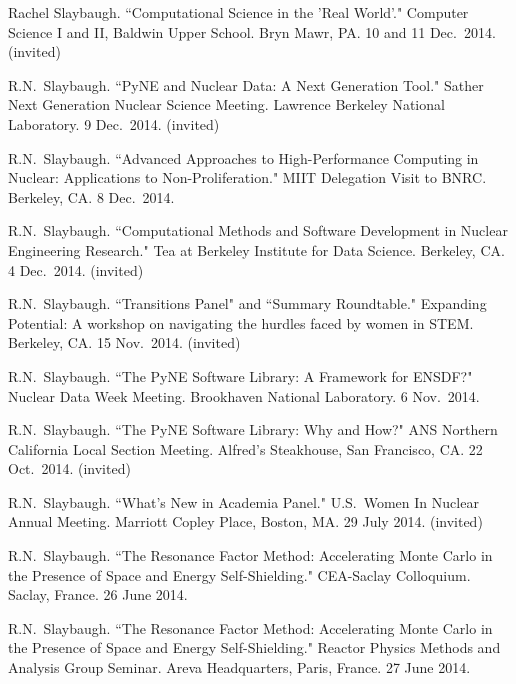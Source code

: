 \begin{bibsection}
\item Rachel Slaybaugh. ``Computational Science in the 'Real World'." Computer Science I and II, Baldwin Upper School. Bryn Mawr, PA. 10 and 11 Dec.\ 2014. (invited)

\item R.N.\ Slaybaugh. ``PyNE and Nuclear Data: A Next Generation Tool." Sather Next Generation Nuclear Science Meeting. Lawrence Berkeley National Laboratory. 9 Dec.\ 2014. (invited)

\item R.N.\ Slaybaugh. ``Advanced Approaches to High-Performance Computing in Nuclear: Applications to Non-Proliferation." MIIT Delegation Visit to BNRC. Berkeley, CA. 8 Dec.\ 2014. 

\item R.N.\ Slaybaugh. ``Computational Methods and Software Development in Nuclear Engineering Research." Tea at Berkeley Institute for Data Science. Berkeley, CA. 4 Dec.\ 2014. (invited)

\item R.N.\ Slaybaugh. ``Transitions Panel" and ``Summary Roundtable." Expanding Potential: A workshop on navigating the hurdles faced by women in STEM. Berkeley, CA. 15 Nov.\ 2014. (invited)

\item R.N.\ Slaybaugh. ``The PyNE Software Library: A Framework for ENSDF?" Nuclear Data Week Meeting. Brookhaven National Laboratory. 6 Nov.\ 2014. 

\item R.N.\ Slaybaugh. ``The PyNE Software Library: Why and How?" ANS Northern California Local Section Meeting. Alfred's Steakhouse, San Francisco, CA. 22 Oct.\ 2014. (invited)

\item R.N.\ Slaybaugh. ``What's New in Academia Panel." U.S.\ Women In Nuclear Annual Meeting. Marriott Copley Place, Boston, MA. 29 July 2014. (invited)

\item R.N.\ Slaybaugh. ``The Resonance Factor Method: Accelerating Monte Carlo in the Presence of Space and Energy Self-Shielding." CEA-Saclay Colloquium. Saclay, France. 26 June 2014.

\item R.N.\ Slaybaugh. ``The Resonance Factor Method: Accelerating Monte Carlo in the Presence of Space and Energy Self-Shielding." Reactor Physics Methods and Analysis Group Seminar. Areva Headquarters, Paris, France. 27 June 2014.


\end{bibsection}
